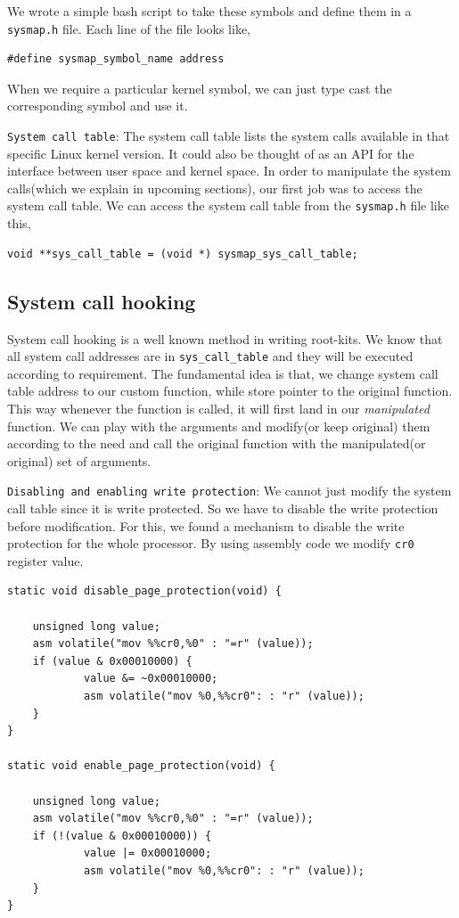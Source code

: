 \documentclass[10pt, letterpaper]{scrartcl}
\begin{document}
We wrote a simple bash script to take these symbols and define them in a \texttt{sysmap.h} file. 
Each line of the file looks like, 

\begin{verbatim}
#define sysmap_symbol_name address
\end{verbatim}

When we require a particular kernel symbol, we can just type cast the corresponding symbol and use it. 

\texttt{System call table}: The system call table lists the system calls available in that specific Linux kernel version. 
It could also be thought of as an API for the interface between user space and kernel space. 
In order to manipulate the system calls(which we explain in upcoming sections), our first job was to access the system call table.
We can access the system call table from the \texttt{sysmap.h} file like this,

\begin{verbatim}
void **sys_call_table = (void *) sysmap_sys_call_table;
\end{verbatim}

\subsection{System call hooking}
System call hooking is a well known method in writing root-kits. 
We know that all system call addresses are in \texttt{sys\_call\_table} and they will be executed according to requirement.
The fundamental idea is that, we change system call table address to our custom function, 
while store pointer to the original function. This way whenever the function is called, 
it will first land in our {\em manipulated} function. 
We can play with the arguments and modify(or keep original) them according to the need and call the original function with the manipulated(or original) set of arguments. 

\texttt{Disabling and enabling write protection}: 
We cannot just modify the system call table since it is write protected. 
So we have to disable the write protection before modification.
For this, we found a mechanism to disable the write protection for the whole processor.
By using assembly code we modify \texttt{cr0} register value.

\begin{verbatim}
static void disable_page_protection(void) {

    unsigned long value;
    asm volatile("mov %%cr0,%0" : "=r" (value));
    if (value & 0x00010000) {
            value &= ~0x00010000;
            asm volatile("mov %0,%%cr0": : "r" (value));
    }
}

static void enable_page_protection(void) {

    unsigned long value;
    asm volatile("mov %%cr0,%0" : "=r" (value));
    if (!(value & 0x00010000)) {
            value |= 0x00010000;
            asm volatile("mov %0,%%cr0": : "r" (value));
    }
}
\end{verbatim}
\end{document}
